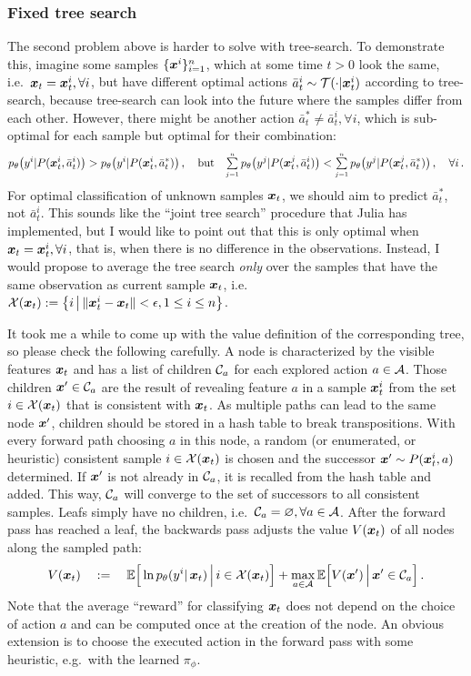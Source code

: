 \subsubsection{Fixed tree search}
The second problem above is harder to solve with tree-search.
To demonstrate this, imagine some samples $\{\bm x^i\}_{i=1}^n$,
which at some time $t > 0$ look the same, 
i.e.~$\bm x_t = \bm x^i_t, \forall i$,
but have different optimal actions 
$\bar a^i_t \sim \mathcal{T}(\cdot|\bm x^i_t)$
according to tree-search, 
because tree-search can look into the future 
where the samples differ from each other.
However, there might be another action 
$\bar a^*_t \neq \bar a^i_t, \forall i$,
which is sub-optimal for each sample but optimal for their combination:
$$
	p_\theta\big(y^i| P(\bm x^i_t, \bar a^i_t)\big) 
	> p_\theta\big(y^i| P(\bm x^i_t, \bar a^*_t)\big) \,, 
	\quad \text{but} \quad
	{\textstyle \sum\limits_{\scriptscriptstyle j=1}^{\scriptscriptstyle n}}\, p_\theta\big(y^j | P(\bm x^j_t, \bar a^i_t)\big) < 
	{\textstyle \sum\limits_{\scriptscriptstyle j=1}^{\scriptscriptstyle n}}\, p_\theta\big(y^j| P(\bm x^j_t, \bar a^*_t)\big) \,, 
	\quad	\forall i\,.
$$
For optimal classification of unknown samples $\bm x_t$, 
we should aim to predict $\bar a^*_t$, not $\bar a^i_t$.
This sounds like the ``joint tree search'' procedure that Julia
has implemented, but I would like to point out that this is
only optimal when $\bm x_t = \bm x^i_t, \forall i$,
that is, when there is no difference in the observations.
Instead, I would propose to average the tree search {\em only} over
the samples that have the same observation as current sample $\bm x_t$, 
i.e.~$\mathcal{X}(\bm x_t) := \big\{ i \,\big|\, 
\|\bm x_t^i - \bm x_t \| < \epsilon, 1 \leq i \leq n\big\}$.

It took me a while to come up with the value definition
of the corresponding tree, so please check the following carefully.
A node is characterized by the visible features $\bm x_t$
and has a list of children $\mathcal{C}_a$ for each explored action $a \in \mathcal{A}$. 
Those children $\bm x' \in \mathcal{C}_a$ 
are the result of revealing feature $a$ 
in a sample $\bm x^i_t$ from the set $i \in \mathcal{X}(\bm x_t)$
that is consistent with $\bm x_t$. 
As multiple paths can lead to the same node $\bm x'$,
children should be stored in a hash table to break transpositions.
With every forward path choosing $a$ in this node, 
a random (or enumerated, or heuristic) 
consistent sample $i \in \mathcal{X}(\bm x_t)$ is chosen
and the successor $\bm x' \sim P(\bm x^i_t, a)$ determined. 
If $\bm x'$ is not already in $\mathcal{C}_a$,
it is recalled from the hash table and added. 
This way, $\mathcal{C}_a$ will converge to the set of 
successors to all consistent samples.
Leafs simply have no children, 
i.e.~$\mathcal{C}_a = \varnothing, \forall a \in \mathcal{A}$.
After the forward pass has reached a leaf,
the backwards pass adjusts the value $V(\bm x_t)$
of all nodes along the sampled path: 
$$
	V(\bm x_t) \quad := \quad 
	\mathbb{E}\Big[\ln p_\theta(y^i |\, \bm x_{t}) 
		\,\Big|\, i \in \mathcal{X}(\bm x_t) \Big]
	+
	\max_{a \in \mathcal{A}} 
	\mathbb{E}\Big[ V(\bm x') \,\Big|\,	\bm x' \in \mathcal{C}_a	\Big]  \,.
$$
Note that the average ``reward'' for classifying $\bm x_t$
does not depend on the choice of action $a$
and can be computed once at the creation of the node.
An obvious extension is to choose the executed action
in the forward pass with some heuristic,
e.g.~with the learned $\pi_\phi$. 


\def\FormatName#1{#1}

{\footnotesize}


